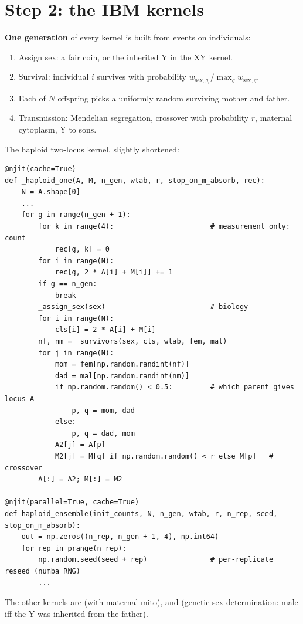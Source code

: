\section{Step 2: the IBM kernels}
\textbf{One generation} of every kernel is built from events on individuals:
\begin{enumerate}
\item Assign sex: a fair coin, or the inherited Y in the XY kernel.
\item Survival: individual $i$ survives with probability $w_{\text{sex},g_i}/\max_g w_{\text{sex},g}$.
\item Each of $N$ offspring picks a uniformly random surviving mother and father.
\item Transmission: Mendelian segregation, crossover with probability $r$, maternal cytoplasm, Y to sons.
\end{enumerate}
The haploid two-locus kernel, slightly shortened:
\begin{lstlisting}
@njit(cache=True)
def _haploid_one(A, M, n_gen, wtab, r, stop_on_m_absorb, rec):
    N = A.shape[0]
    ...
    for g in range(n_gen + 1):
        for k in range(4):                       # measurement only: count
            rec[g, k] = 0
        for i in range(N):
            rec[g, 2 * A[i] + M[i]] += 1
        if g == n_gen:
            break
        _assign_sex(sex)                         # biology
        for i in range(N):
            cls[i] = 2 * A[i] + M[i]
        nf, nm = _survivors(sex, cls, wtab, fem, mal)
        for j in range(N):
            mom = fem[np.random.randint(nf)]
            dad = mal[np.random.randint(nm)]
            if np.random.random() < 0.5:         # which parent gives locus A
                p, q = mom, dad
            else:
                p, q = dad, mom
            A2[j] = A[p]
            M2[j] = M[q] if np.random.random() < r else M[p]   # crossover
        A[:] = A2; M[:] = M2

@njit(parallel=True, cache=True)
def haploid_ensemble(init_counts, N, n_gen, wtab, r, n_rep, seed, stop_on_m_absorb):
    out = np.zeros((n_rep, n_gen + 1, 4), np.int64)
    for rep in prange(n_rep):
        np.random.seed(seed + rep)               # per-replicate reseed (numba RNG)
        ...
\end{lstlisting}
The other kernels are  (with maternal mito),  and  (genetic sex determination: male iff the Y was inherited from the father).


